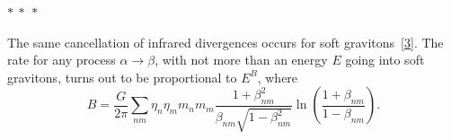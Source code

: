 \begin{center}
$*\ *\ *$
\end{center}

The same cancellation of infrared divergences occurs for soft
gravitons~\hyperref[ref:13.3]{[3]}. The rate for any process
$\alpha\to\beta$, with not more than an energy $E$ going into soft gravitons,
turns out to be proportional to $E^B$, where
\begin{equation}
B=\frac{G}{2\pi}\sum_{nm}\eta_n\eta_m m_nm_m
\frac{1+\beta_{nm}^2}{\beta_{nm}\sqrt{1-\beta_{nm}^2}}
\ln\left(\frac{1+\beta_{nm}}{1-\beta_{nm}}\right).
\tag{13.3.12}\label{eq:13.3.12}
\end{equation}
